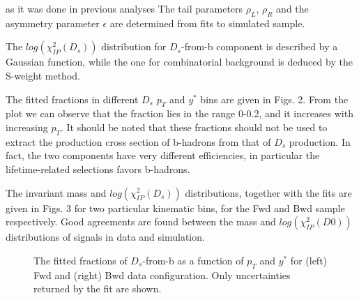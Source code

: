 \documentclass[
10pt, %
a4paper, %
oneside, %
headinclude,footinclude, %
BCOR5mm, %
]{scrartcl}
\begin{document}
as it was done in previous analyses The tail parameters $\rho_L$, $\rho_R$ and the asymmetry parameter $\epsilon$ are determined from fits to simulated sample.\par

The $log(\chi^2_{IP}(D_s))$ distribution for $D_s$-from-b component is described by a Gaussian function, while the one for combinatorial background is deduced by the S-weight method.\par

The fitted fractions in different $D_s$ $p_T$ and $y^*$ bins are given in Figs. 2. From the plot we can observe that the fraction lies in the range 0-0.2, and it increases with increasing $p_T$. It should be noted that these fractions should not be used to extract the production cross section of b-hadrons from that of $D_s$ production. In fact, the two components have very different efficiencies, in particular the lifetime-related selections favors b-hadrons.\par

The invariant mass and $log(\chi^2_{IP}(D_s))$ distributions, together with the fits are given in Figs. 3  for two particular kinematic bins, for the Fwd and Bwd sample respectively. Good agreements are found between the mass and $log(\chi^2_{IP}(D0))$ distributions of signals in data and simulation. 

\begin{figure}[tb]
\centering
{} \quad
{} \quad
\caption[$D_s$-from-b fraction]{The fitted fractions of $D_s$-from-b as a function of $p_T$ and $y^*$ for (left) Fwd and (right) Bwd data configuration. Only uncertainties returned by the fit are shown.} %
\label{fig:esempio}
\end{figure}
\end{document}
